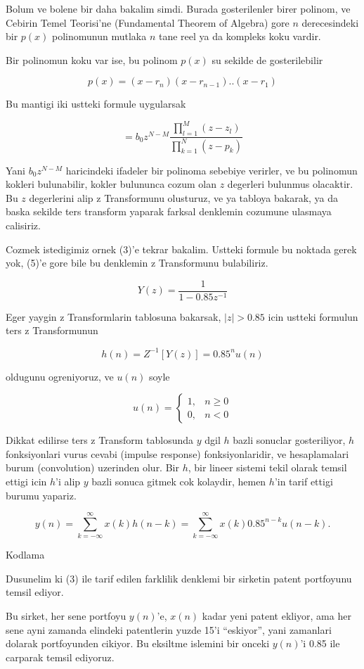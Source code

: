 \documentclass[12pt,fleqn]{article}
\begin{document}
Bolum ve bolene bir daha bakalim simdi. Burada gosterilenler birer polinom,
ve Cebirin Temel Teorisi'ne (Fundamental Theorem of Algebra) gore $n$
derecesindeki bir $p(x)$ polinomunun mutlaka $n$ tane reel ya da kompleks
koku vardir. 

Bir polinomun koku var ise, bu polinom $p(x)$ su sekilde de gosterilebilir

\[ p(x) = (x-r_n)(x-r_{n-1})..(x-r_1) \]

Bu mantigi iki ustteki formule uygularsak 

\[ = b_0 z^{N - M} 
\frac{\prod_{l=1}^{M}(z-z_l)}{ \prod_{k=1}^{N}(z-p_k) }
\]

Yani $b_0z^{N-M}$ haricindeki ifadeler bir polinoma sebebiye verirler, ve
bu polinomun kokleri bulunabilir, kokler bulununca cozum olan $z$ degerleri
bulunmus olacaktir. Bu $z$ degerlerini alip z Transformunu olusturuz, ve ya
tabloya bakarak, ya da baska sekilde ters transform yaparak farksal
denklemin cozumune ulasmaya calisiriz. 

Cozmek istedigimiz ornek (3)'e tekrar bakalim. Ustteki formule bu noktada
gerek yok, (5)'e gore bile bu denklemin z Transformunu bulabiliriz. 

\[ Y(z) = \frac{1}{1-0.85z^{-1}} \]

Eger yaygin z Transformlarin tablosuna bakarsak, $|z|>0.85$ icin ustteki
formulun ters z Transformunun 

\[ h(n) = Z^{-1} [Y(z)] = 0.85^nu(n) \]

oldugunu ogreniyoruz, ve $u(n)$ soyle 

\[ u(n) = 
\left\{ \begin{array}{ll}
1, & n \ge 0\\
0, & n < 0
\end{array} \right.
 \]

Dikkat edilirse ters z Transform tablosunda $y$ dgil $h$ bazli sonuclar
gosteriliyor, $h$ fonksiyonlari vurus cevabi (impulse response)
fonksiyonlaridir, ve hesaplamalari burum (convolution) uzerinden olur. Bir
$h$, bir lineer sistemi tekil olarak temsil ettigi icin $h$'i alip $y$
bazli sonuca gitmek cok kolaydir, hemen $h$'in tarif ettigi burumu
yapariz. 

\[ y(n) = \sum_{k=-\infty}^\infty x(k) h(n-k) = \sum_{k=-\infty}^\infty x(k) 0.85^{n-k} u(n-k). \]

Kodlama

Dusunelim ki (3) ile tarif edilen farklilik denklemi bir sirketin patent
portfoyunu temsil ediyor. 

Bu sirket, her sene portfoyu $y(n)$'e, $x(n)$ kadar yeni patent ekliyor,
ama her sene ayni zamanda elindeki patentlerin yuzde 15'i ``eskiyor'', yani
zamanlari dolarak portfoyunden cikiyor. Bu eksiltme islemini bir onceki
$y(n)$'i 0.85 ile carparak temsil ediyoruz. 
\end{document}
